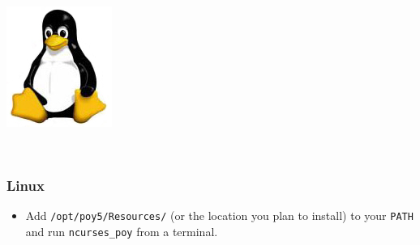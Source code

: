 {\begin{flushleft}
\begin{minipage}[c]{0.074\textwidth}
\includegraphics[width=\textwidth]{doc/figures/figlogolinux.jpg}
\end{minipage}
\,
\begin{minipage}[t]{0.88\textwidth}
\subsubsection*{Linux}
\end{minipage}
\begin{itemize}
\item Add \texttt{/opt/poy5/Resources/} (or the location you plan to install) to your \texttt{PATH} and run
\texttt{ncurses\_poy} from a terminal.
\end{itemize}
\end{flushleft}

}
